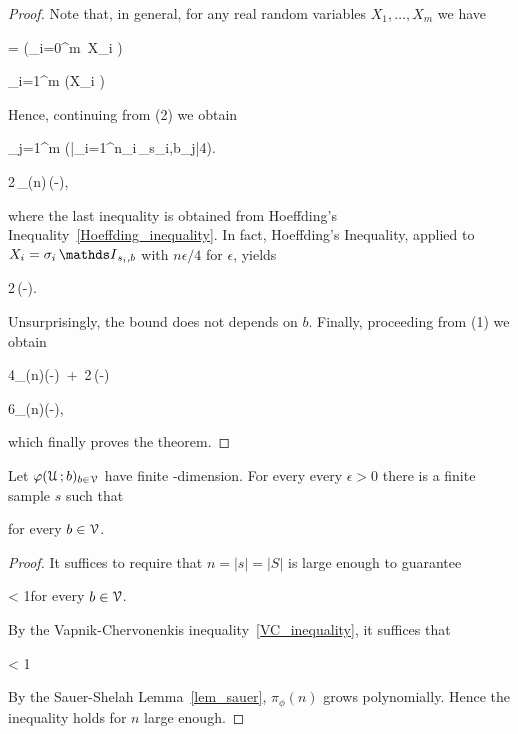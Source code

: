\documentclass[scombinatorics.tex]{subfiles}
\begin{document}
\begin{proof}
  Note that, in general, for any real random variables $X_1,\dots,X_m$ we have

  {=}
  {\Pr\Big(\bigcup_{i=0}^m\ X_i \ge \epsilon\Big)}

  \ceq{}
  {\le}
  {\sum_{i=1}^m \Pr\big(X_i \ge\epsilon\big)}

  Hence, continuing from (2) we obtain

  \ceq{}
  {\le}
  {\sum_{j=1}^m \Pr\bigg(\Big|\sum_{i=1}^n\sigma_i\,\Indicator_{s_i,b_j}\Big|\ge{}4\bigg).}

  \ceq{}
  {\le}
  {2\,\pi_\phi(n)\,\exp\bigg(-\bigg),}

  where the last inequality is obtained from Hoeffding's Inequality~\ref{Hoeffding_inequality}.
  In fact, Hoeffding's Inequality, applied to $X_i=\sigma_i\,\Indicator_{s_i,b}$ with $n\epsilon/4$ for $\epsilon$, yields

  {\le}
  {2\,\exp\Big(-\Big).}

  Unsurprisingly, the bound does not depends on $b$.
  Finally, proceeding from (1) we obtain

  \ceq{}
  {\le}
  {4\pi_\phi(n)\exp\Big(-\Big)\ +\ 2\,\exp\Big(-\Big)}

  \ceq{}
  {\le}
  {6\pi_\phi(n)\exp\Big(-\Big),}

  which finally proves the theorem.
\end{proof}

\begin{corollary}
  Let $\varphi(\EuScript U\,;b)_{b\in\EuScript V}$ have finite \vc-dimension. 
  For every every $\epsilon>0$ there is a finite sample $s$ such that

  \hfill for every $b\in\EuScript V$.
\end{corollary}
\begin{proof}
  It suffices to require that $n=|s|=|S|$ is large enough to guarantee 
  
  {<}
  {1}\hfill for every $b\in\EuScript V$.

  By the Vapnik-Chervonenkis inequality~\ref{VC_inequality}, it suffices that

  {<}
  {1}

  By the Sauer-Shelah Lemma~\ref{lem_sauer}, $\pi_\phi(n)$ grows polynomially.
  Hence the inequality holds for $n$ large enough.
\end{proof}
\end{document}
